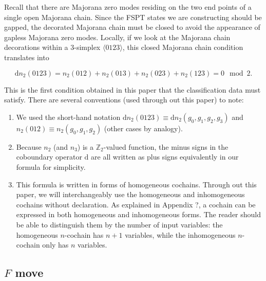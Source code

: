\documentclass[%
 reprint,
 amsmath,amssymb,
 aps,
prb,
]{revtex4-2}
\begin{document}
Recall that there are Majorana zero modes residing on the two end points of a single open Majorana chain.
Since the FSPT states we are constructing should be gapped, the decorated Majorana chain must be closed to avoid the appearance of gapless Majorana zero modes.
Locally, if we look at the Majorana chain decorations within a 3-simplex $\langle 0123 \rangle$, this closed Majorana chain condition translates into 
\begin{widetext}
\begin{equation}
\mathrm d n_{2} (0123)= n_2(012) + n_2(013) + n_2(023) + n_2(123) = 0 \mod 2 .
\end{equation}
\end{widetext}
This is the first condition obtained in this paper that the classification data must satisfy.
There are several conventions (used through out this paper) to note:
\begin{enumerate}
\item We used the short-hand notation $\mathrm d n_{2} (0123) \equiv \mathrm d n_{2} (g_0, g_1, g_2, g_3)$ and $n_{2} (012) \equiv n_{2} (g_0, g_1, g_2)$ (other cases by analogy).
\item Because $n_2$ (and $n_3$) is a $\mathbb Z_2$-valued function, the minus signs in the coboundary operator $\mathrm d$ are all written as plus signs equivalently in our formula for simplicity.
\item This formula is written in forms of homogeneous cochains. Through out this paper, we will interchangeably use the homogeneous and inhomogeneous cochains without declaration.
As explained in Appendix ?, a cochain can be expressed in both homogeneous and inhomogeneous forms.
The reader should be able to distinguish them by the number of input variables: the homogeneous $n$-cochain has $n+1$ variables, while the inhomogeneous $n$-cochain only has $n$ variables.
\end{enumerate}

\subsection{$F$ move}
\end{document}
